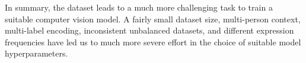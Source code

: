 In summary, the \emotic{} dataset leads to a much more challenging task to train a suitable computer vision model. A fairly small dataset size, multi-person context, multi-label encoding, inconsistent unbalanced datasets, and different expression frequencies have led us to much more severe effort in the choice of suitable model hyperparameters.

